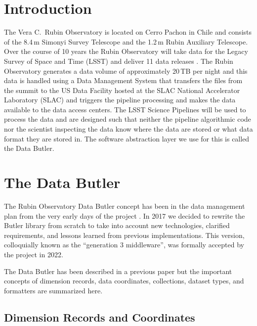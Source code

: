 \section{Introduction}

The Vera C.\ Rubin Observatory is located on Cerro Pachon in Chile and consists of the 8.4\,m Simonyi Survey Telescope and the 1.2\,m Rubin Auxiliary Telescope.
Over the course of 10 years the Rubin Observatory will take data for the Legacy Survey of Space and Time (LSST) and deliver 11 data releases \cite{2019ApJ...873..111I}.
The Rubin Observatory generates a data volume of approximately 20\,TB per night and this data is handled using a Data Management System \cite{2022arXiv221113611O} that transfers the files from the summit to the US Data Facility hosted at the SLAC National Accelerator Laboratory (SLAC) and triggers the pipeline processing and makes the data available to the data access centers.
The LSST Science Pipelines \cite{2019ASPC..523..521B} will be used to process the data and are designed such that neither the pipeline algorithmic code nor the scientist inspecting the data know where the data are stored or what data format they are stored in.
The software abstraction layer we use for this is called the Data Butler. \cite{2019ASPC..523..653J,2022SPIE12189E..11J}

\section{The Data Butler}

The Rubin Observatory Data Butler concept has been in the data management plan from the very early days of the project \cite{2007ASPC..376....3K,2010SPIE.7740E..15A}.
In 2017 \cite{LDM-563} we decided to rewrite the Butler library from scratch to take into account new technologies, clarified requirements, \cite{LDM-556} and lessons learned from previous implementations.
This version, colloquially known as the ``generation 3 middleware'', was formally accepted by the project in 2022. \cite{DMTR-271}

The Data Butler has been described in a previous paper \cite{2022SPIE12189E..11J} but the important concepts of dimension records, data coordinates, collections, dataset types, and formatters are summarized here.

\subsection{Dimension Records and Coordinates}

